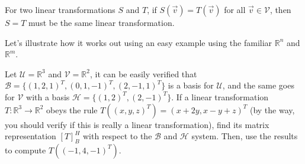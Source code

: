 \begin{proper}
\label{proper:sametrans}
For two linear transformations $S$ and $T$, if $S(\vec{v}) = T(\vec{v})$ for all $\vec{v} \in \mathcal{V}$, then $S = T$ must be the same linear transformation.
\end{proper}

Let's illustrate how it works out using an easy example using the familiar $\mathbb{R}^n$ and $\mathbb{R}^m$. 
\begin{exmp}
\label{exmp:lineartransmatrixrep}
Let $\mathcal{U} = \mathbb{R}^3$ and $\mathcal{V} = \mathbb{R}^2$, it can be easily verified that $\mathcal{B} = \{(1,2,1)^T, (0,1,-1)^T, (2,-1,1)^T\}$ is a basis for $\mathcal{U}$, and the same goes for $\mathcal{V}$ with a basis $\mathcal{H} = \{(1,2)^T, (2,-1)^T\}$. If a linear transformation $T: \mathbb{R}^3 \to \mathbb{R}^2$ obeys the rule $T((x,y,z)^T) = (x+2y, x-y+z)^T$ (by the way, you should verify if this is really a linear transformation), find its matrix representation $[T]_B^H$ with respect to the $\mathcal{B}$ and $\mathcal{H}$ system. Then, use the results to compute $T((-1,4,-1)^T)$.
\end{exmp}
